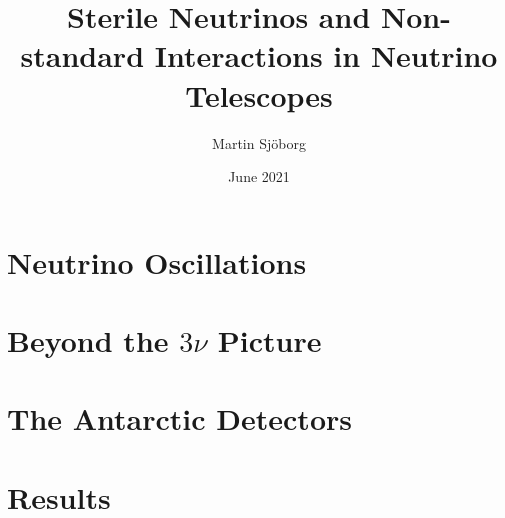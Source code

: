 
\renewcommand{\familydefault}{\rmdefault}

% 


\title{Sterile Neutrinos and Non-standard Interactions in Neutrino Telescopes}
\author{Martin Sjöborg}
\date{June 2021}
\address{SE-106 91 Stockholm, Sweden}


\maketitle

\cleardoublepage

%

%

\tableofcontents

%


\mainmatter

\cleardoublepage
\chapter{Neutrino Oscillations}\label{ch:osc}


\chapter{Beyond the $3\nu$ Picture}\label{ch:theory}


\chapter{The Antarctic Detectors}\label{ch:ic}



\chapter{Results}\label{ch:results}




% 
% 

